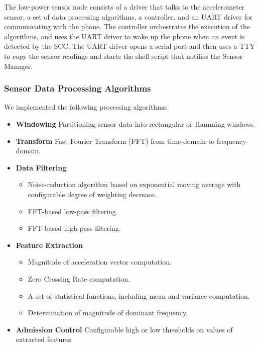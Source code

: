 The low-power sensor node consists of a driver that talks to
the accelerometer sensor, a set of data processing algorithms, a controller,
and an UART driver for communicating with the phone.  The controller
orchestrates the execution of the algorithms, and uses the UART driver to
wake up the phone when an event is detected by the SCC.  The UART driver
opens a serial port and then uses a TTY to copy the sensor readings
and starts the shell script that notifies the Sensor Manager.


\subsubsection{Sensor Data Processing Algorithms}
\label{sec:sensorDataAlgorithms}

We implemented the following processing algorithms:

\begin{itemize}

	\item {\bf Windowing} Partitioning sensor data into rectangular or Hamming windows.
		
	\item {\bf Transform} Fast Fourier Transform (FFT) from time-domain to frequency-domain.
	  
	\item {\bf Data Filtering} 
		\begin{itemize}
			\item Noise-reduction algorithm based on exponential moving average with 
	  configurable degree of weighting decrease.
			\item FFT-based low-pass filtering.
			\item FFT-based high-pass filtering.
		\end{itemize}

	\item {\bf Feature Extraction} 
		\begin{itemize}
			\item Magnitude of acceleration vector computation.
			\item Zero Crossing Rate computation.
			\item A set of statistical functions, including mean and variance computation.
			\item Determination of magnitude of dominant frequency.
		\end{itemize}

	\item {\bf Admission Control} Configurable high or low thresholds on values of extracted features.
  
\end{itemize}

